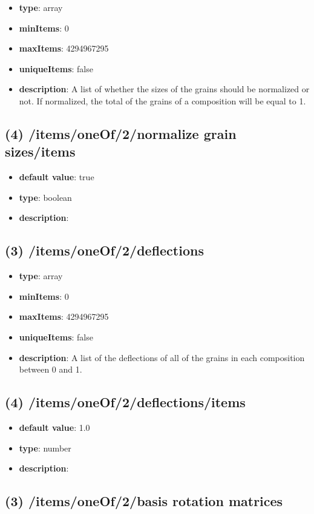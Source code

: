 \begin{itemize}[leftmargin=3em]\item {\bf type}: array
\item {\bf minItems}: 0
\item {\bf maxItems}: 4294967295
\item {\bf uniqueItems}: false
\item {\bf description}: A list of whether the sizes of the grains should be normalized or not. If normalized, the total of the grains of a composition will be equal to 1.
\end{itemize}\subsection{(4) /items/oneOf/2/normalize grain sizes/items}
\begin{itemize}[leftmargin=4em]\item {\bf default value}: true
\item {\bf type}: boolean
\item {\bf description}: 
\end{itemize}\subsection{(3) /items/oneOf/2/deflections}
\begin{itemize}[leftmargin=3em]\item {\bf type}: array
\item {\bf minItems}: 0
\item {\bf maxItems}: 4294967295
\item {\bf uniqueItems}: false
\item {\bf description}: A list of the deflections of all of the grains in each composition between 0 and 1.
\end{itemize}\subsection{(4) /items/oneOf/2/deflections/items}
\begin{itemize}[leftmargin=4em]\item {\bf default value}: 1.0
\item {\bf type}: number
\item {\bf description}: 
\end{itemize}\subsection{(3) /items/oneOf/2/basis rotation matrices}
